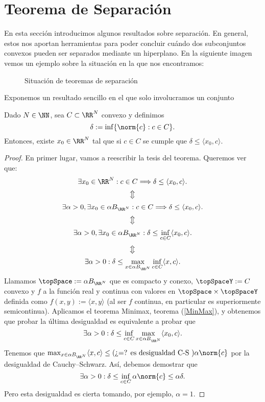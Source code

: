 \chapter{Teorema de Separación}

En esta sección introducimos algunos resultados sobre separación. En general, estos nos aportan herramientas para poder concluir cuándo dos subconjuntos convexos pueden ser separados mediante un hiperplano. En la siguiente imagen vemos un ejemplo sobre la situación en la que nos encontramos:

\begin{figure}[h!]
\begin{center}
\end{center}
\caption{Situación de teoremas de separación}
\end{figure}

Exponemos un resultado sencillo en el que solo involucramos un conjunto

\begin{teoremaBox}\label{sep1}
Dado $ N \in \NN $, sea $ C \subset \RR^N $ convexo y definimos
\[
\delta := \inf\{ \norm{c}: c \in C \}.
\]
Entonces, existe $ x_0 \in \RR^N $ tal que si $ c \in C $ se cumple que $ \delta \leq \langle x_0,c\rangle $.
\end{teoremaBox}
\begin{proof}
En primer lugar, vamos a reescribir la tesis del teorema. Queremos ver que:
\[
\exists x_0 \in \RR^N : c \in C \Longrightarrow \delta \leq \langle x_0,c\rangle.
\]
\[
\big\Updownarrow
\]
\[
\exists \alpha > 0, \exists x_0 \in \alpha B_{\RR^N} : c \in C \Longrightarrow \delta \leq \langle x_0,c\rangle.
\]
\[
\big\Updownarrow
\]
\[
\exists \alpha > 0, \exists x_0 \in \alpha B_{\RR^N} : \delta \leq \inf_{c\in C}\langle x_0,c\rangle.
\]
\[
\big\Updownarrow
\]
\[
\exists \alpha > 0 : \delta \leq \max_{x\in \alpha B_{\RR^N}}\inf_{c\in C}\langle x,c\rangle.
\]
Llamamos $ \topSpace := \alpha B_{\RR^N}$ que es compacto y conexo, $ \topSpaceY:= C$ convexo y $ f $ a la función real y continua con valores en $ \topSpace \times \topSpaceY $ definida como $ f(x,y):=\langle x,y \rangle $ (al ser $ f $ continua, en particular es superiormente semicontinua). Aplicamos el teorema Minimax, teorema (\ref{MinMax}), y obtenemos que probar la última desigualdad es equivalente a probar que
\[
\exists \alpha > 0 : \delta \leq \inf_{c\in C}\max_{x\in \alpha B_{\RR^N}}\langle x_0,c\rangle.
\]
Tenemos que $ \max_{x\in \alpha B_{\RR^N}}\langle x,c\rangle \leq \text{(¿=? es desigualdad C-S )} \alpha \norm{c} $ por la desigualdad de Cauchy–Schwarz. Así, debemos demostrar que
\[
\exists \alpha > 0 : \delta \leq \inf_{c\in C} \alpha \norm{c} \leq \alpha \delta.
\]
Pero esta desigualdad es cierta tomando, por ejemplo, $ \alpha = 1 $.
\end{proof}


